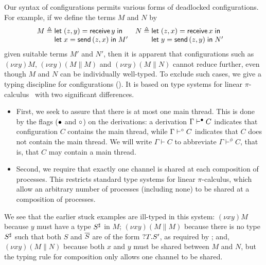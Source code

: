 \documentclass[oribibl,orivec,envcountsame]{llncs}
\begin{document}
Our syntax of configurations permits various forms of deadlocked configurations.  For example, if we
define the terms $M$ and $N$ by
\begin{align*}
  M &\defeq \bl
    \gvlet{(z,y)}{\gvreceive{y}}{} \\
    \gvlet{x}{\gvsend{(z,x)}}{M'} \el &
  N &\defeq \bl
    \gvlet{(z,x)}{\gvreceive{x}}{} \\
    \gvlet{y}{\gvsend{(z,y)}}{N'} \el
\end{align*}
given suitable terms $M'$ and $N'$, then it is apparent that configurations such as $(\nu xy)M$,
$(\nu xy)(M \parallel M)$ and $(\nu xy)(M \parallel N)$ cannot reduce further, even though $M$ and
$N$ can be individually well-typed.  To exclude such cases, we give a typing discipline for
configurations (). It is based on type systems for linear
$\pi$-calculus~\cite{Kobayashi96} with two significant differences.
\begin{itemize}
\item First, we seek to assure that there is at most one main thread.  This is done by the flags
  (${\mathord{\bullet}}$ and ${\mathord{\circ}}$) on the derivations: a derivation $\Gamma \vdash^{\mathord{\bullet}} C$ indicates that
  configuration $C$ contains the main thread, while $\Gamma \vdash^{\mathord{\circ}} C$ indicates that $C$ does
  not contain the main thread.  We will write $\Gamma \vdash C$ to abbreviate $\Gamma \vdash^\phi
  C$, that is, that $C$ may contain a main thread.
\item Second, we require that exactly one channel is shared at each composition of processes.  This
  restricts standard type systems for linear $\pi$-calculus, which allow an arbitrary number of
  processes (including none) to be shared at a composition of processes.
\end{itemize}
We see that the earlier stuck examples are ill-typed in this system: $(\nu xy)M$ because $y$ must
have a type $S^\sharp$ in $M$; $(\nu xy)(M \parallel M)$ because there is no type $S^\sharp$
such that both $S$ and $\overline{S}$ are of the form ${?T.S'}$, as required by
; and, $(\nu xy)(M \parallel N)$ because both $x$ and $y$ must be shared between
$M$ and $N$, but the typing rule for composition only allows one channel to be shared.
\end{document}
